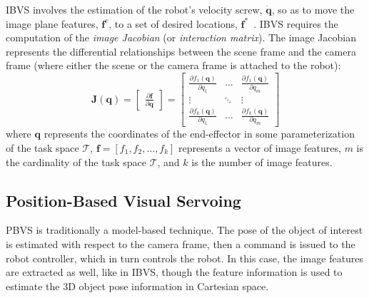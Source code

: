 \ac{IBVS} involves the estimation of the robot's velocity screw, $\dot{\mathbf{q}}$, so as to move the image plane features, ${\mathbf{f}}^c$, to a set of desired locations, ${\mathbf{f}}^*$~\cite{malis:2002}. \ac{IBVS} requires the computation of the \emph{image Jacobian} (or \emph{interaction matrix}). The image Jacobian represents the differential relationships between the scene frame and the camera frame (where either the scene or the camera frame is attached to the robot):
%
\begin{equation}
\mathbf{J}(\mathbf{q}) =
	\begin{bmatrix}
	\frac{\partial \mathbf{f}}{\partial \mathbf{q}}
	\end{bmatrix} =
	\begin{bmatrix}
	\frac{\partial f_1(\mathbf{q})}{\partial q_1} & \dots & \frac{\partial f_1(\mathbf{q})}{\partial q_m} \\
	\vdots & \ddots & \vdots \\
	\frac{\partial f_k(\mathbf{q})}{\partial q_1} & \dots & \frac{\partial f_k(\mathbf{q})}{\partial q_m}
	\end{bmatrix}
\end{equation}
%
where $\mathbf{q}$ represents the coordinates of the end-effector in some parameterization of the task space $\mathcal{T}$, $\mathbf{f} = [f_1, f_2, \dots, f_k]$ represents a vector of image features, $m$ is the cardinality of the task space $\mathcal{T}$, and $k$ is the number of image features.

\subsection{Position-Based Visual Servoing}

\ac{PBVS} is traditionally a model-based technique. The pose of the object of interest is estimated with respect to the camera frame, then a command is issued to the robot controller, which in turn controls the robot. In this case, the image features are extracted as well, like in \ac{IBVS}, though the feature information is used to estimate the 3D object pose information in Cartesian space.

